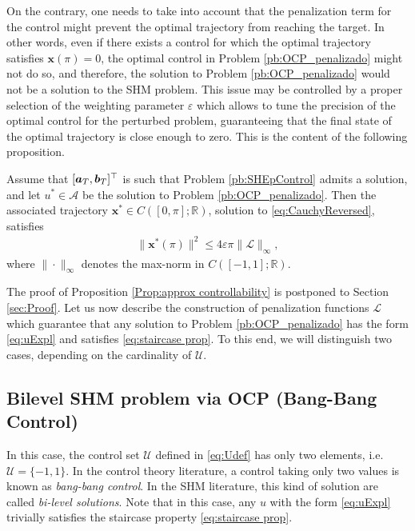 \documentclass[9pt,shortpaper,twoside,web]{ieeecolor}
\begin{document}
On the contrary, one needs to take into account that the penalization term for the control might prevent the optimal trajectory from reaching the target. In other words, even if there exists a control for which the optimal trajectory satisfies $\bm{x} (\pi) = 0$, the optimal control in Problem \ref{pb:OCP_penalizado} might not do so, and therefore, the solution to Problem \ref{pb:OCP_penalizado} would not be a solution to the SHM problem. This issue may be controlled by a proper selection of the weighting parameter $\varepsilon$ which allows to tune the precision of the optimal control for the perturbed problem, guaranteeing that the final state of the optimal trajectory is close enough to zero. This is the content of the following proposition.

\begin{proposition}\label{Prop:approx controllability}
	Assume that $[\bm{a}_T,\bm{b}_T]^\top$ is such that Problem \ref{pb:SHEpControl} admits a solution, and let $u^\ast\in \mathcal A$ be the solution to Problem \ref{pb:OCP_penalizado}. Then the associated trajectory $\bm{x}^\ast\in C([0,\pi];\mathbb{R})$, solution to \eqref{eq:CauchyReversed}, satisfies
	\begin{align*} 
		\| \bm{x}^\ast (\pi)  \|^2 \leq  4 \varepsilon \pi \| \mathcal{L}\|_\infty,
	\end{align*}
	where $\| \cdot\|_\infty$ denotes the max-norm in $C([-1,1]; \mathbb{R})$.
\end{proposition}

The proof of Proposition \ref{Prop:approx controllability} is postponed to Section \ref{sec:Proof}. Let us now describe the construction of penalization functions $\mathcal{L}$ which guarantee that any solution to Problem \ref{pb:OCP_penalizado} has the form \eqref{eq:uExpl} and satisfies \eqref{eq:staircase prop}. To this end, we will distinguish two cases, depending on the cardinality of $\mathcal{U}$.

\subsection{Bilevel SHM problem via OCP (Bang-Bang Control)} 

In this case, the control set $\mathcal{U}$ defined in \eqref{eq:Udef} has only two elements, i.e.  $\mathcal{U}=\{-1,1\}$.
In the control theory literature, a control taking only two values is known as \emph{bang-bang control}. In the SHM literature, this kind of solution are called \textit{bi-level solutions}. Note that in this case, any $u$ with the form \eqref{eq:uExpl}  trivially satisfies the staircase property \eqref{eq:staircase prop}.
\end{document}
